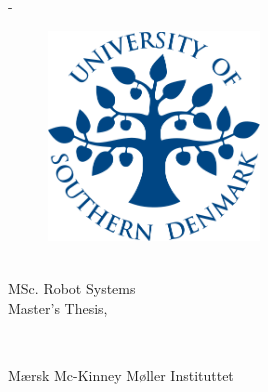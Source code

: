 \begin{titlingpage}
	\thispagestyle{empty}
	\enlargethispage{1.3cm}
	\calccentering{\unitlength}
	\begin{adjustwidth}{\unitlength}{-\unitlength}
		\vspace*{-1.9cm}
		\begin{figure} %
			\centering
			\includegraphics[width=0.5\textwidth]{figures/front_matter/SDU2013_SDU_Logo}
		\end{figure}

		\begin{centering}
			\begin{Spacing}{1.2}
				{\sffamily\HUGE\textbf{\ThTitleEN}\\[1cm]}
				{\sffamily\LARGE{MSc. Robot Systems}\\[1cm]}
				{\sffamily\LARGE{Master's Thesis, \ThEndDate}\\[1cm]}
			\end{Spacing}
			{\LARGE\sffamily\ThAuthors\\[2cm]}
		\end{centering}
		\begin{raggedright}
			\sffamily\LARGE{Mærsk Mc-Kinney Møller Instituttet}
		\end{raggedright}
	\end{adjustwidth}


\end{titlingpage}
